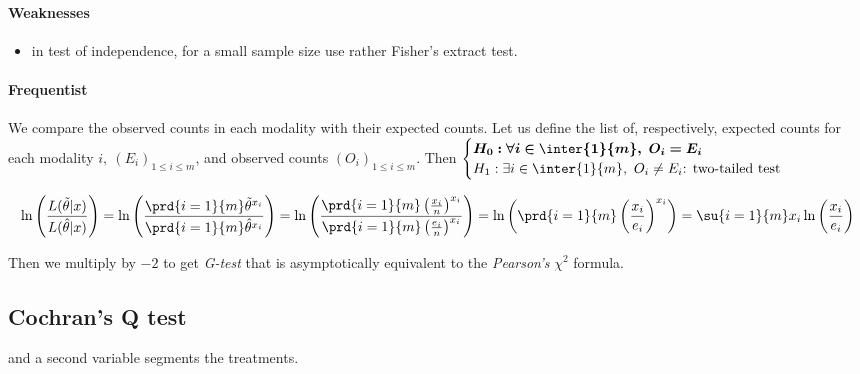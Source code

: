 \paragraph{Weaknesses}
\begin{itemize}
    \item in test of independence, for a small sample size use rather Fisher's extract 
        test.
\end{itemize}


\paragraph{Frequentist}
We compare the observed counts in each modality with their expected counts.
Let us define the list of, respectively, expected counts for each modality 
$i,~(E_{i})_{1\leq i\leq m}$, and observed counts $(O_{i})_{1\leq i\leq m}$.
Then
$\begin{cases}
    \bm{H_{0}: \forall i\in \inter{1}{m},~O_{i} = E_{i}}\\
    H_{1}: \exists i\in \inter{1}{m},~O_{i} \neq E_{i}\text{: two-tailed test} \\
\end{cases}$

\begin{center}
\end{center}

$$
\ln\left(\dfrac{L(\tilde{\theta}|x)}{L(\hat{\theta}|x)}\right)
= \ln\left(\dfrac{\prd{i=1}{m}\tilde{\theta}^{x_{i}}}{\prd{i=1}{m}\hat{\theta}^{x_{i}}}\right)
= \ln\left(\dfrac{\prd{i=1}{m}\left(\frac{x_{i}}{n}\right)^{x_{i}}}{\prd{i=1}{m}\left(\frac{e_{i}}{n}\right)^{x_{i}}}\right)
= \ln\left(\prd{i=1}{m}\left(\dfrac{x_{i}}{e_{i}}\right)^{x_{i}}\right)
= \su{i=1}{m}x_{i}\ln\left(\dfrac{x_{i}}{e_{i}}\right)
$$

Then we multiply by $-2$ to get \emph{G-test} that is asymptotically equivalent to the 
\emph{Pearson's} $\chi^{2}$ formula.


\subsection{Cochran's Q test}
 and a second variable segments the treatments.

